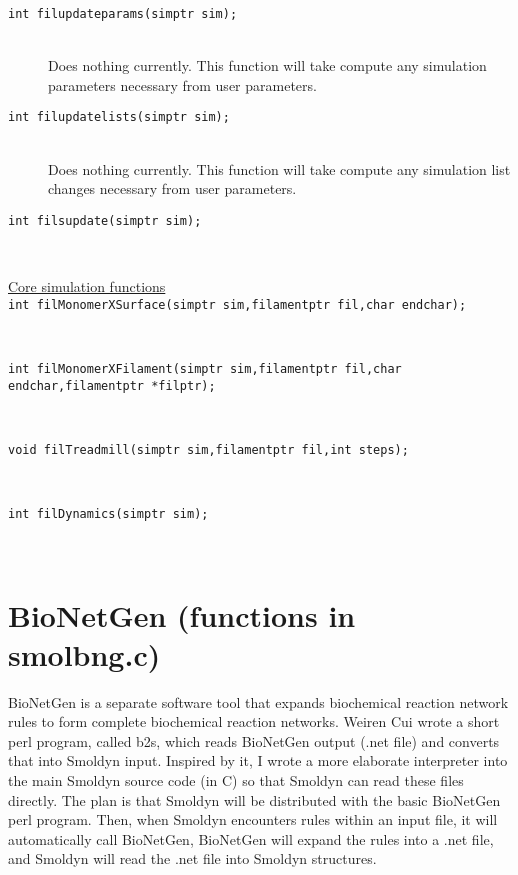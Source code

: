\documentclass {book}
\newcommand {\ttt} {\texttt}
\begin{document}
\begin{description}
\item[\ttt{int filupdateparams(simptr sim);}]
\hfill \\
Does nothing currently. This function will take compute any simulation parameters necessary from user parameters.

\item[\ttt{int filupdatelists(simptr sim);}]
\hfill \\
Does nothing currently. This function will take compute any simulation list changes necessary from user parameters.

\item[\ttt{int filsupdate(simptr sim);}]
\hfill \\

\item[\underline{Core simulation functions}]

\item[\ttt{int filMonomerXSurface(simptr sim,filamentptr fil,char endchar);}]
\hfill \\

\item[\ttt{int filMonomerXFilament(simptr sim,filamentptr fil,char endchar,filamentptr *filptr);}]
\hfill \\

\item[\ttt{void filTreadmill(simptr sim,filamentptr fil,int steps);}]
\hfill \\

\item[\ttt{int filDynamics(simptr sim);}]
\hfill \\



\end{description}

\section{BioNetGen (functions in smolbng.c)}

BioNetGen is a separate software tool that expands biochemical reaction network rules to form complete biochemical reaction networks. Weiren Cui wrote a short perl program, called b2s, which reads BioNetGen output (.net file) and converts that into Smoldyn input. Inspired by it, I wrote a more elaborate interpreter into the main Smoldyn source code (in C) so that Smoldyn can read these files directly. The plan is that Smoldyn will be distributed with the basic BioNetGen perl program. Then, when Smoldyn encounters rules within an input file, it will automatically call BioNetGen, BioNetGen will expand the rules into a .net file, and Smoldyn will read the .net file into Smoldyn structures.
\end{document}
